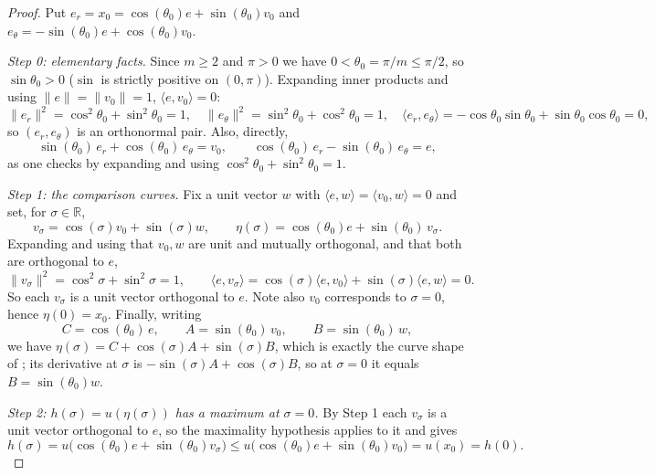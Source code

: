 \begin{proof}
Put $e_r=x_0=\cos(\theta_0)e+\sin(\theta_0)v_0$ and
$e_\theta=-\sin(\theta_0)e+\cos(\theta_0)v_0$.

\emph{Step 0: elementary facts.} Since $m\ge2$ and $\pi>0$ we have
$0<\theta_0=\pi/m\le\pi/2$, so $\sin\theta_0>0$ ($\sin$ is strictly positive on
$(0,\pi)$). Expanding inner products and using
$\lVert e\rVert=\lVert v_0\rVert=1$, $\langle e,v_0\rangle=0$:
\begin{equation}\label{eq:tlb-frame}
  \lVert e_r\rVert^2=\cos^2\theta_0+\sin^2\theta_0=1,
  \quad
  \lVert e_\theta\rVert^2=\sin^2\theta_0+\cos^2\theta_0=1,
  \quad
  \langle e_r,e_\theta\rangle=-\cos\theta_0\sin\theta_0+\sin\theta_0\cos\theta_0=0,
\end{equation}
so $(e_r,e_\theta)$ is an orthonormal pair. Also, directly,
\begin{equation}\label{eq:tlb-decomp}
  \sin(\theta_0)\,e_r+\cos(\theta_0)\,e_\theta=v_0,
  \qquad
  \cos(\theta_0)\,e_r-\sin(\theta_0)\,e_\theta=e ,
\end{equation}
as one checks by expanding and using $\cos^2\theta_0+\sin^2\theta_0=1$.

\emph{Step 1: the comparison curves.} Fix a unit vector $w$ with
$\langle e,w\rangle=\langle v_0,w\rangle=0$ and set, for $\sigma\in\mathbb{R}$,
\[
  v_\sigma=\cos(\sigma)v_0+\sin(\sigma)w,
  \qquad
  \eta(\sigma)=\cos(\theta_0)e+\sin(\theta_0)\,v_\sigma .
\]
Expanding and using that $v_0,w$ are unit and mutually orthogonal, and that both
are orthogonal to $e$,
\[
  \lVert v_\sigma\rVert^2=\cos^2\sigma+\sin^2\sigma=1,
  \qquad
  \langle e,v_\sigma\rangle=\cos(\sigma)\langle e,v_0\rangle+\sin(\sigma)\langle e,w\rangle=0 .
\]
So each $v_\sigma$ is a unit vector orthogonal to $e$. Note also
$v_0$ corresponds to $\sigma=0$, hence $\eta(0)=x_0$. Finally, writing
\[
  C=\cos(\theta_0)\,e,\qquad A=\sin(\theta_0)\,v_0,\qquad B=\sin(\theta_0)\,w,
\]
we have $\eta(\sigma)=C+\cos(\sigma)A+\sin(\sigma)B$, which is exactly the curve
shape of ; its derivative at $\sigma$ is
$-\sin(\sigma)A+\cos(\sigma)B$, so at $\sigma=0$ it equals
$B=\sin(\theta_0)w$.

\emph{Step 2: $h(\sigma)=u(\eta(\sigma))$ has a maximum at $\sigma=0$.} By
Step 1 each $v_\sigma$ is a unit vector orthogonal to $e$, so the maximality
hypothesis applies to it and gives
\[
  h(\sigma)=u\bigl(\cos(\theta_0)e+\sin(\theta_0)v_\sigma\bigr)
  \le u\bigl(\cos(\theta_0)e+\sin(\theta_0)v_0\bigr)=u(x_0)=h(0).
\]


\end{proof}
